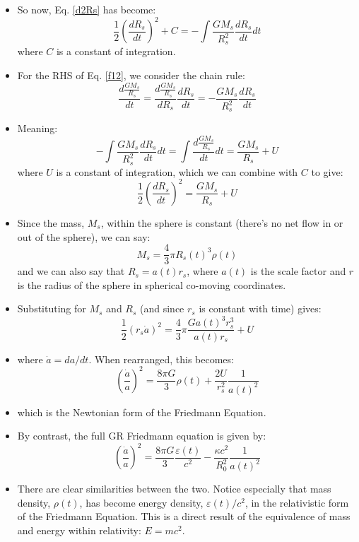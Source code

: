 \documentclass[11pt]{article}
\begin{document}
\begin{itemize}
\begin{equation}
\end{equation}
\item So now, Eq. \ref{d2Rs} has become:
\begin{equation}
    \label{f12}
    \frac{1}{2}\left(\frac{dR_s}{dt}\right)^2 + C = -\int\frac{GM_s}{R_s^2}\frac{dR_s}{dt}dt
\end{equation}
where $C$ is a constant of integration.
\item For the RHS of Eq. \ref{f12}, we consider the chain rule:
\begin{equation}
\frac{d\frac{GM_s}{R_s}}{dt} = \frac{d\frac{GM_s}{R_s}}{dR_s}\frac{dR_s}{dt} = -\frac{GM_s}{R_s^2}\frac{dR_s}{dt}
\end{equation}
\item Meaning:
\begin{equation}
-\int\frac{GM_s}{R_s^2}\frac{dR_s}{dt} dt = \int \frac{d\frac{GM_s}{R_s}}{dt}dt = \frac{GM_s}{R_s} + U
\end{equation}
where $U$ is a constant of integration, which we can combine with $C$ to give:
\begin{equation}
    \frac{1}{2}\left(\frac{dR_s}{dt}\right)^2 = \frac{GM_s}{R_s} + U
\end{equation}
\item Since the mass, $M_s$, within the sphere is constant (there's no net flow in or out of the sphere), we can say:
\begin{equation}
M_s = \frac{4}{3}\pi R_s(t)^3\rho(t)
\end{equation}
and we can also say that $R_s = a(t)r_s$, where $a(t)$ is the scale factor and $r$ is the radius of the sphere in spherical co-moving coordinates.
\item Substituting for $M_s$ and $R_s$ (and since $r_s$ is constant with time) gives:
\begin{equation}
\frac{1}{2}\left(r_s\dot{a}\right)^2 = \frac{4}{3}\pi\frac{Ga(t)^3r_s^3}{a(t)r_s} + U
\end{equation}
\item where $\dot{a} = da/dt$. When rearranged, this becomes:
\begin{equation}
\left(\frac{\dot{a}}{a}\right)^2 = \frac{8\pi G}{3}\rho(t) + \frac{2U}{r_s^2}\frac{1}{a(t)^2}
\end{equation}
\item which is the Newtonian form of the Friedmann Equation.
\item By contrast, the full GR Friedmann equation is given by:
\begin{equation}
\left(\frac{\dot{a}}{a}\right)^2 = \frac{8\pi G}{3}\frac{\varepsilon(t)}{c^2} - \frac{\kappa c^2}{R_0^2}\frac{1}{a(t)^2}    
\end{equation}
\item There are clear similarities between the two. Notice especially that mass density, $\rho(t)$, has become energy density, $\varepsilon(t)/c^2$, in the relativistic form of the Friedmann Equation. This is a direct result of the equivalence of mass and energy within relativity: $E = mc^2$.
\end{itemize}
\end{document}
